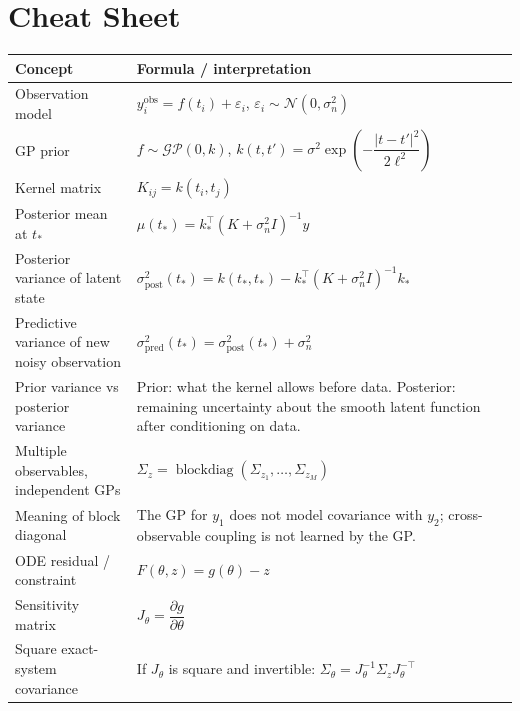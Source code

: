 \documentclass[11pt]{article}
\begin{document}
\section*{Cheat Sheet}

\renewcommand{\arraystretch}{1.25}
\begin{center}
\small
\begin{tabular}{p{} p{}}
\toprule
\textbf{Concept} & \textbf{Formula / interpretation} \\
\midrule
Observation model &
$y_i^{\mathrm{obs}} = f(t_i) + \varepsilon_i$, \quad $\varepsilon_i \sim \mathcal{N}(0,\sigma_n^2)$ \\

GP prior &
$f \sim \mathcal{GP}(0,k)$, \quad
$k(t,t') = \sigma^2 \exp\!\left(-\dfrac{|t-t'|^2}{2\ell^2}\right)$ \\

Kernel matrix &
$K_{ij} = k(t_i,t_j)$ \\

Posterior mean at $t_*$ &
$\mu(t_*) = k_*^\top (K+\sigma_n^2 I)^{-1} y$ \\

Posterior variance of latent state &
$\sigma^2_{\mathrm{post}}(t_*) = k(t_*,t_*) - k_*^\top (K+\sigma_n^2 I)^{-1}k_*$ \\

Predictive variance of new noisy observation &
$\sigma^2_{\mathrm{pred}}(t_*) = \sigma^2_{\mathrm{post}}(t_*) + \sigma_n^2$ \\

Prior variance vs posterior variance &
Prior: what the kernel allows before data. Posterior: remaining uncertainty about the smooth latent function after conditioning on data. \\

Multiple observables, independent GPs &
$\Sigma_z = \operatorname{blockdiag}(\Sigma_{z_1},\dots,\Sigma_{z_M})$ \\

Meaning of block diagonal &
The GP for $y_1$ does not model covariance with $y_2$; cross-observable coupling is not learned by the GP. \\

ODE residual / constraint &
$F(\theta,z) = g(\theta)-z$ \\

Sensitivity matrix &
$J_\theta = \dfrac{\partial g}{\partial \theta}$ \\

Square exact-system covariance &
If $J_\theta$ is square and invertible:
$\Sigma_\theta = J_\theta^{-1}\Sigma_z J_\theta^{-\top}$ \\


\end{tabular}
\end{center}
\end{document}
